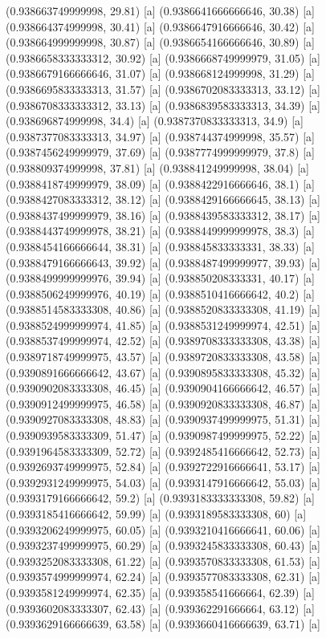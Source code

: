 {{{(0.938663749999998, 29.81) [a] 
(0.9386641666666646, 30.38) [a] 
(0.938664374999998, 30.41) [a] 
(0.9386647916666646, 30.42) [a] 
(0.938664999999998, 30.87) [a] 
(0.9386654166666646, 30.89) [a] 
(0.9386658333333312, 30.92) [a] 
(0.9386668749999979, 31.05) [a] 
(0.9386679166666646, 31.07) [a] 
(0.938668124999998, 31.29) [a] 
(0.9386695833333313, 31.57) [a] 
(0.9386702083333313, 33.12) [a] 
(0.9386708333333312, 33.13) [a] 
(0.9386839583333313, 34.39) [a] 
(0.938696874999998, 34.4) [a] 
(0.9387370833333313, 34.9) [a] 
(0.9387377083333313, 34.97) [a] 
(0.938744374999998, 35.57) [a] 
(0.9387456249999979, 37.69) [a] 
(0.9387774999999979, 37.8) [a] 
(0.938809374999998, 37.81) [a] 
(0.938841249999998, 38.04) [a] 
(0.9388418749999979, 38.09) [a] 
(0.9388422916666646, 38.1) [a] 
(0.9388427083333312, 38.12) [a] 
(0.9388429166666645, 38.13) [a] 
(0.9388437499999979, 38.16) [a] 
(0.9388439583333312, 38.17) [a] 
(0.9388443749999978, 38.21) [a] 
(0.9388449999999978, 38.3) [a] 
(0.9388454166666644, 38.31) [a] 
(0.938845833333331, 38.33) [a] 
(0.9388479166666643, 39.92) [a] 
(0.9388487499999977, 39.93) [a] 
(0.9388499999999976, 39.94) [a] 
(0.938850208333331, 40.17) [a] 
(0.9388506249999976, 40.19) [a] 
(0.9388510416666642, 40.2) [a] 
(0.9388514583333308, 40.86) [a] 
(0.9388520833333308, 41.19) [a] 
(0.9388524999999974, 41.85) [a] 
(0.9388531249999974, 42.51) [a] 
(0.9388537499999974, 42.52) [a] 
(0.9389708333333308, 43.38) [a] 
(0.9389718749999975, 43.57) [a] 
(0.9389720833333308, 43.58) [a] 
(0.9390891666666642, 43.67) [a] 
(0.9390895833333308, 45.32) [a] 
(0.9390902083333308, 46.45) [a] 
(0.9390904166666642, 46.57) [a] 
(0.9390912499999975, 46.58) [a] 
(0.9390920833333308, 46.87) [a] 
(0.9390927083333308, 48.83) [a] 
(0.9390937499999975, 51.31) [a] 
(0.9390939583333309, 51.47) [a] 
(0.9390987499999975, 52.22) [a] 
(0.9391964583333309, 52.72) [a] 
(0.9392485416666642, 52.73) [a] 
(0.9392693749999975, 52.84) [a] 
(0.9392722916666641, 53.17) [a] 
(0.9392931249999975, 54.03) [a] 
(0.9393147916666642, 55.03) [a] 
(0.9393179166666642, 59.2) [a] 
(0.9393183333333308, 59.82) [a] 
(0.9393185416666642, 59.99) [a] 
(0.9393189583333308, 60) [a] 
(0.9393206249999975, 60.05) [a] 
(0.9393210416666641, 60.06) [a] 
(0.9393237499999975, 60.29) [a] 
(0.9393245833333308, 60.43) [a] 
(0.9393252083333308, 61.22) [a] 
(0.9393570833333308, 61.53) [a] 
(0.9393574999999974, 62.24) [a] 
(0.9393577083333308, 62.31) [a] 
(0.9393581249999974, 62.35) [a] 
(0.939358541666664, 62.39) [a] 
(0.9393602083333307, 62.43) [a] 
(0.939362291666664, 63.12) [a] 
(0.9393629166666639, 63.58) [a] 
(0.9393660416666639, 63.71) [a] 
}}}

